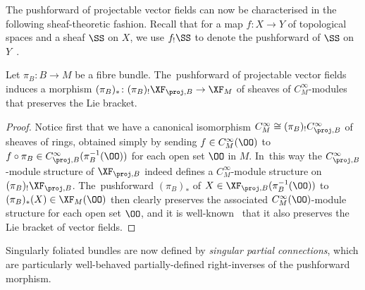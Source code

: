 The pushforward of projectable vector fields can now be characterised in the following sheaf-theoretic fashion. Recall that for a map $f\colon X\rightarrow Y$ of topological spaces and a sheaf $\SS$ on $X$, we use $f_{!}\SS$ to denote the pushforward of $\SS$ on $Y$~\cite[p.~65]{hartshorne}.

\begin{Proposition}
Let $\pi_{B}\colon B\rightarrow M$ be a fibre bundle. The~pushforward of projectable vector fields induces a morphism $(\pi_{B})_{*}\colon (\pi_{B})_{!}\XF_{\proj,B}\rightarrow\XF_{M}$ of sheaves of $C^{\infty}_{M}$-modules that preserves the Lie bracket.
\end{Proposition}

\begin{proof}
Notice first that we have a canonical isomorphism $C^{\infty}_{M}\cong (\pi_{B})_{!}C^{\infty}_{\proj,B}$ of sheaves of rings, obtained simply by sending $f\in C^{\infty}_{M}(\OO)$ to $f\circ\pi_{B}\in C^{\infty}_{\proj,B}(\pi_{B}^{-1}(\OO))$ for each open set $\OO$ in $M$. In~this way the $C^{\infty}_{\proj,B}$-module structure of $\XF_{\proj,B}$ indeed defines a $C^{\infty}_{M}$-module structure on $(\pi_{B})_{!}\XF_{\proj,B}$. The~pushforward $(\pi_{B})_{*}$ of $X\in\XF_{\proj,B}(\pi_{B}^{-1}(\OO))$ to $(\pi_{B})_{*}(X)\in\XF_{M}(\OO)$ then clearly preserves the associated $C^{\infty}_{M}(\OO)$-module structure for each open set $\OO$, and it is well-known~\cite[Lemma~3.10]{natopdiffgeom} that it also preserves the Lie bracket of vector fields.
\end{proof}

Singularly foliated bundles are now defined by \textit{singular partial connections}, which are particularly well-behaved partially-defined right-inverses of the pushforward morphism.

